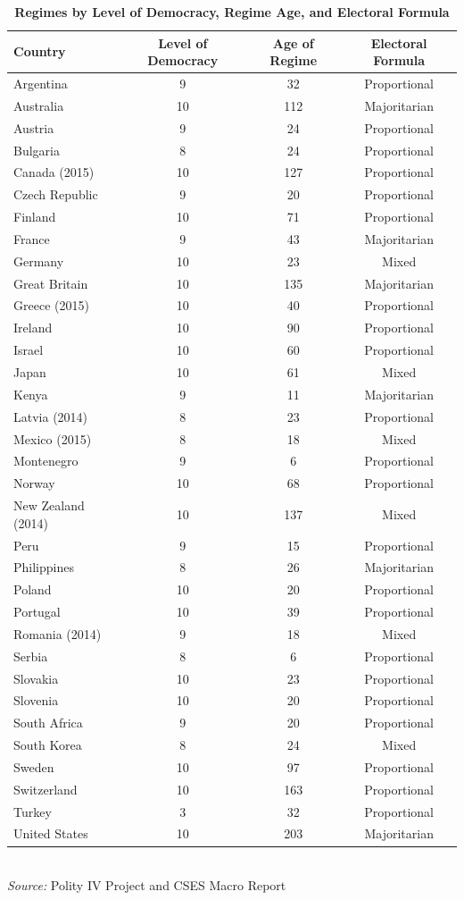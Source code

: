 \documentclass[12pt, titlepage]{article}
\newcommand\e{\emph}
\newcommand\tb{\textbf}
\begin{document}
\begin{appendices}
\begin{table} [h!]
	\centering
	\caption{\tb{Regimes by Level of Democracy, Regime Age, and Electoral Formula}}
	\begin{tabulary}{\linewidth}{l c c c}
		\hline
		\tb{Country} & \tb{Level of Democracy} & \tb{Age of Regime} & \tb{Electoral Formula} \\
		\hline
		Argentina&9&32&Proportional \\
		Australia& 10&112&Majoritarian \\
		Austria&9&24&Proportional\\
		Bulgaria&8&24&Proportional\\
		Canada (2015)&10&127&Proportional\\
		Czech Republic&9&20&Proportional \\
		Finland&10&71& Proportional \\
		France&9&43&Majoritarian \\
		Germany&10&23&Mixed \\
		Great Britain&10&135&Majoritarian \\
		Greece (2015)&10&40&Proportional \\
		Ireland&10&90&Proportional \\
		Israel&10&60&Proportional \\
		Japan&10&61&Mixed\\
		Kenya&9&11&Majoritarian \\
		Latvia (2014)&8&23&Proportional\\
		Mexico (2015)& 8&18&Mixed\\
		Montenegro&9&6&Proportional\\
		Norway&10&68&Proportional\\
		New Zealand (2014)& 10& 137& Mixed\\
		Peru&9&15&Proportional\\
		Philippines&8&26&Majoritarian\\
		Poland&10&20&Proportional\\
		Portugal&10&39&Proportional\\
		Romania (2014) &9&18& Mixed \\
		Serbia& 8&6&Proportional\\
		Slovakia&10&23&Proportional\\
		Slovenia&10&20&Proportional\\
		South Africa&9&20& Proportional \\
		South Korea&8&24&Mixed\\
		Sweden&10&97&Proportional\\ 
		Switzerland&10&163&Proportional\\
		Turkey&3&32&Proportional\\
		United States&10&203&Majoritarian \\
		\hline
	\end{tabulary}
\\
\e{Source:} Polity IV Project and CSES Macro Report
\label{table101}
\end{table}


\end{appendices}
\end{document}

